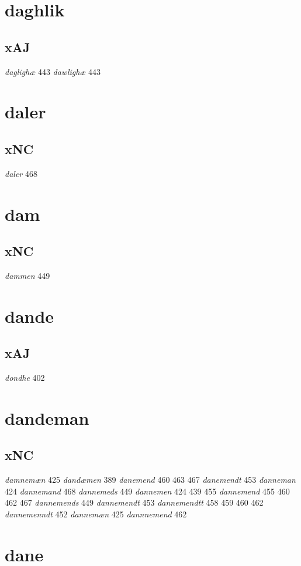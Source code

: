 \documentclass[a4paper,twocolumn]{article}
\begin{document}
\section{daghlik}
\label{sec:org836ce36}
\subsection{xAJ}
\label{sec:orgcf861d3}
\emph{daglighæ} 443 \emph{dawlighæ} 443 
\section{daler}
\label{sec:orgcdc32bb}
\subsection{xNC}
\label{sec:org20452e6}
\emph{daler} 468 
\section{dam}
\label{sec:org1f6b8d1}
\subsection{xNC}
\label{sec:org246efac}
\emph{dammen} 449 
\section{dande}
\label{sec:org10731f1}
\subsection{xAJ}
\label{sec:org1922295}
\emph{dondhe} 402 
\section{dandeman}
\label{sec:org709fca6}
\subsection{xNC}
\label{sec:orge71ad35}
\emph{damnemæn} 425 \emph{dandæmen} 389 \emph{danemend} 460 463 467 \emph{danemendt} 453 \emph{danneman} 424 \emph{dannemand} 468 \emph{dannemeds} 449 \emph{dannemen} 424 439 455 \emph{dannemend} 455 460 462 467 \emph{dannemends} 449 \emph{dannemendt} 453 \emph{dannemendtt} 458 459 460 462 \emph{dannemenndt} 452 \emph{dannemæn} 425 \emph{dannnemend} 462 
\section{dane}
\label{sec:org9141044}
\end{document}
